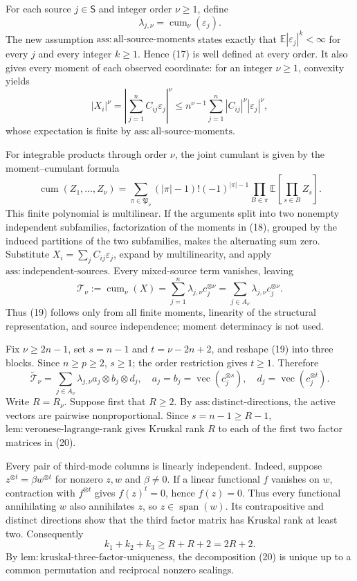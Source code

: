 For each source \(j\in\mathsf S\) and integer order \(\nu\ge1\), define
\[
 \lambda_{j,\nu}=\operatorname{cum}_\nu(\varepsilon_j). \tag{17}
\]
The new assumption \(\mathrm{ass:all\text{-}source\text{-}moments}\) states exactly that \(\mathbb E|\varepsilon_j|^k<\infty\) for every \(j\) and every integer \(k\ge1\). Hence (17) is well defined at every order. It also gives every moment of each observed coordinate: for an integer \(\nu\ge1\), convexity yields
\[
 |X_i|^\nu
 =\left|\sum_{j=1}^n C_{ij}\varepsilon_j\right|^\nu
 \le n^{\nu-1}\sum_{j=1}^n |C_{ij}|^\nu|\varepsilon_j|^\nu,
\]
whose expectation is finite by \(\mathrm{ass:all\text{-}source\text{-}moments}\).

For integrable products through order \(\nu\), the joint cumulant is given by the moment--cumulant formula
\[
 \operatorname{cum}(Z_1,\ldots,Z_\nu)
 =\sum_{\pi\in\mathfrak P_\nu}
 (|\pi|-1)!(-1)^{|\pi|-1}
 \prod_{B\in\pi}\mathbb E\!\left[\prod_{s\in B}Z_s\right]. \tag{18}
\]
This finite polynomial is multilinear. If the arguments split into two nonempty independent subfamilies, factorization of the moments in (18), grouped by the induced partitions of the two subfamilies, makes the alternating sum zero. Substitute \(X_i=\sum_j C_{ij}\varepsilon_j\), expand by multilinearity, and apply \(\mathrm{ass:independent\text{-}sources}\). Every mixed-source term vanishes, leaving
\[
 \mathcal T_\nu:=\operatorname{cum}_\nu(X)
 =\sum_{j=1}^n\lambda_{j,\nu}c_j^{\otimes\nu}
 =\sum_{j\in A_\nu}\lambda_{j,\nu}c_j^{\otimes\nu}. \tag{19}
\]
Thus (19) follows only from all finite moments, linearity of the structural representation, and source independence; moment determinacy is not used.

Fix \(\nu\ge2n-1\), set \(s=n-1\) and \(t=\nu-2n+2\), and reshape (19) into three blocks. Since \(n\ge p\ge2\), \(s\ge1\); the order restriction gives \(t\ge1\). Therefore
\[
 \widetilde{\mathcal T}_\nu
 =\sum_{j\in A_\nu}\lambda_{j,\nu}a_j\otimes b_j\otimes d_j,
 \quad
 a_j=b_j=\operatorname{vec}(c_j^{\otimes s}),
 \quad
 d_j=\operatorname{vec}(c_j^{\otimes t}). \tag{20}
\]
Write \(R=R_\nu\). Suppose first that \(R\ge2\). By \(\mathrm{ass:distinct\text{-}directions}\), the active vectors are pairwise nonproportional. Since \(s=n-1\ge R-1\), \(\mathrm{lem:veronese\text{-}lagrange\text{-}rank}\) gives Kruskal rank \(R\) to each of the first two factor matrices in (20).

Every pair of third-mode columns is linearly independent. Indeed, suppose \(z^{\otimes t}=\beta w^{\otimes t}\) for nonzero \(z,w\) and \(\beta\ne0\). If a linear functional \(f\) vanishes on \(w\), contraction with \(f^{\otimes t}\) gives \(f(z)^t=0\), hence \(f(z)=0\). Thus every functional annihilating \(w\) also annihilates \(z\), so \(z\in\operatorname{span}(w)\). Its contrapositive and distinct directions show that the third factor matrix has Kruskal rank at least two. Consequently
\[
 k_1+k_2+k_3\ge R+R+2=2R+2. \tag{21}
\]
By \(\mathrm{lem:kruskal\text{-}three\text{-}factor\text{-}uniqueness}\), the decomposition (20) is unique up to a common permutation and reciprocal nonzero scalings.

